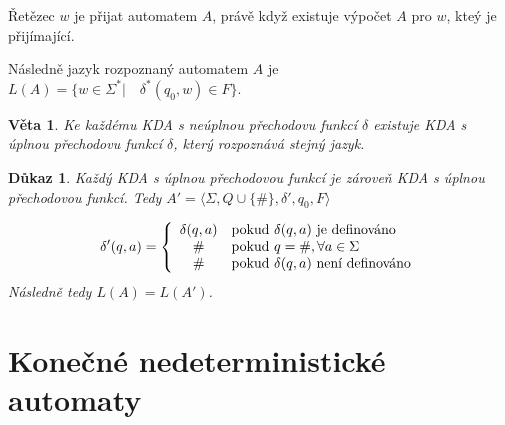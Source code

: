 \documentclass[10pt, a4paper, titlepage]{article}
\theoremstyle{note}
\newtheorem{veta}{Věta}
\newtheorem{dukaz}{Důkaz}
\begin{document}
Řetězec $w$ je přijat automatem $A$, právě když existuje výpočet $A$ pro $w$, kteý je přijímající.

Následně jazyk rozpoznaný automatem $A$ je $L(A) = \lbrace w \in \Sigma^*| \quad \delta^*(q_0,w) \in F \rbrace$.

\begin{veta}
Ke každému KDA s neúplnou přechodovu funkcí $\delta$ existuje KDA s úplnou přechodovu funkcí $\delta$, který rozpoznává stejný jazyk.
\end{veta}

\begin{dukaz}
Každý KDA s úplnou přechodovou funkcí je zároveň KDA s úplnou přechodovou funkcí. Tedy
$A' = \langle \Sigma, Q \cup \lbrace \# \rbrace, \delta', q_0, F \rangle$

\begin{gather*}
\delta'(q,a) = \left\lbrace
\begin{array}{c l}
\delta(q,a) & \text{pokud } \delta(q,a) \text{ je definováno} \\
\# & \text{pokud } q = \#, \forall a \in \Sigma \\
\# & \text{pokud } \delta(q,a) \text{ není definováno}
\end{array}
\right. \\
\end{gather*}
Následně tedy $L(A) = L(A')$.
\end{dukaz}



\section{Konečné nedeterministické automaty}
\end{document}
